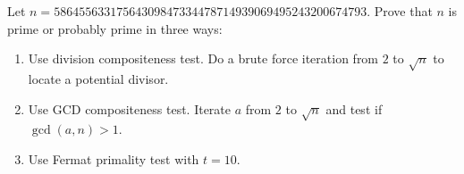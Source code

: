  Let $n = 58645563317564309847334478714939069495243200674793$.
  Prove that $n$ is prime or probably prime in three ways:
  \begin{enumerate}[nosep,label=\textnormal{(\alph*)}]
  \item Use division compositeness test.
    Do a brute force iteration from $2$ to $\sqrt{n}$
    to locate a potential divisor.
  \item Use GCD compositeness test.
    Iterate $a$ from $2$ to $\sqrt{n}$
    and test if $\gcd(a, n) > 1$.
  \item
    Use Fermat primality test with $t = 10$.
  \end{enumerate}

